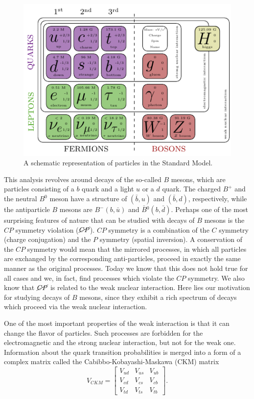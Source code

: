 \begin{figure}[H]
	\centering
	\includegraphics[scale=1.6]{texfig/SM}
	\captionsetup{width=.8\linewidth}
	\caption{A schematic representation of particles in the Standard Model.}
	\label{fig:sm}
\end{figure}

This analysis revolves around decays of the so-called $B$ mesons, which are particles consisting of a $b$ quark and a light $u$ or a $d$ quark. The charged $B^+$ and the neutral $B^0$ meson have a structure of $(\bar b, u)$ and $(\bar b, d)$, respectively, while the antiparticle $B$ mesons are $B^-(b, \bar u)$ and $\bar B{}^0(b, \bar d)$.  Perhaps one of the most surprising features of nature that can be studied with decays of $B$ mesons is the $CP$ symmetry violation ($\cancel{CP}$). $CP$ symmetry is a combination of the $C$ symmetry (charge conjugation) and the $P$ symmetry (spatial inversion). A conservation of the $CP$ symmetry would mean that the mirrored processes, in which all particles are exchanged by the corresponding anti-particles, proceed in exactly the same manner as the original processes. Today we know that this does not hold true for all cases and we, in fact, find processes which violate the $CP$ symmetry. We also know that $\cancel{CP}$ is related to the weak nuclear interaction. Here lies our motivation for studying decays of $B$ mesons, since they exhibit a rich spectrum of decays which proceed via the weak nuclear interaction.

One of the most important properties of the weak interaction is that it can change the flavor of particles. Such processes are forbidden for the electromagnetic and the strong nuclear interaction, but not for the weak one. Information about the quark transition probabilities is merged into a form of a complex matrix called the Cabibbo-Kobayashi-Maskawa (CKM) matrix \cite{cabibbo1963unitary,kobayashi1973cp}
\begin{equation}
V_{CKM} = \begin{bmatrix}
V_{ud} & V_{us} & V_{ub}\\
V_{cd} & V_{cs} & V_{cb}\\
V_{td} & V_{ts} & V_{tb}
\end{bmatrix}.
\end{equation}

